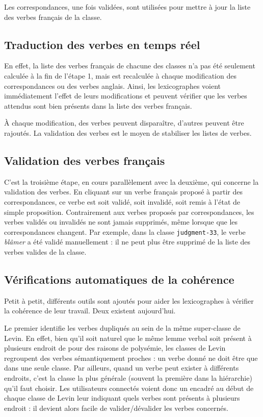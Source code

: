Les correspondances, une fois validées, sont utilisées pour mettre à jour la
liste des verbes français de la classe.

\subsection{Traduction des verbes en temps réel}

En effet, la liste des verbes français de chacune des classes n'a pas été
seulement calculée à la fin de l'étape 1, mais est recalculée à chaque
modification des correspondances ou des verbes anglais. Ainsi, les
lexicographes voient immédiatement l'effet de leurs modifications et peuvent
vérifier que les verbes attendus sont bien présents dans la liste des verbes
français.

À chaque modification, des verbes peuvent disparaître, d'autres peuvent être
rajoutés. La validation des verbes est le moyen de stabiliser les listes de
verbes.

\subsection{Validation des verbes français}

C'est la troisième étape, en cours parallèlement avec la deuxième, qui concerne
la validation des verbes. En cliquant sur un verbe français proposé à partir
des correspondances, ce verbe est soit validé, soit invalidé, soit remis à
l'état de simple proposition. Contrairement aux verbes proposés par
correspondances, les verbes validés ou invalidés ne sont jamais supprimés, même
lorsque que les correspondances changent. Par exemple, dans la classe
\texttt{judgment-33}, le verbe \textit{blâmer} a été validé manuellement : il ne
peut plus être supprimé de la liste des verbes valides de la classe.

\subsection{Vérifications automatiques de la cohérence}

Petit à petit, différents outils sont ajoutés pour aider les lexicographes à
vérifier la cohérence de leur travail. Deux existent aujourd'hui.

Le premier identifie les verbes dupliqués au sein de la même super-classe de
Levin. En effet, bien qu'il soit naturel que le même lemme verbal soit présent
à plusieurs endroit de \verbenet{} pour des raisons de polysémie, les classes
de Levin regroupent des verbes sémantiquement proches : un verbe donné ne doit
être que dans une seule classe. Par ailleurs, quand un verbe peut exister à
différents endroits, c'est la classe la plus générale (souvent la première dans
la hiérarchie) qu'il faut choisir. Les utilisateurs connectés voient donc un
encadré au début de chaque classe de Levin leur indiquant quels verbes sont
présents à plusieurs endroit : il devient alors facile de valider/dévalider les
verbes concernés.

